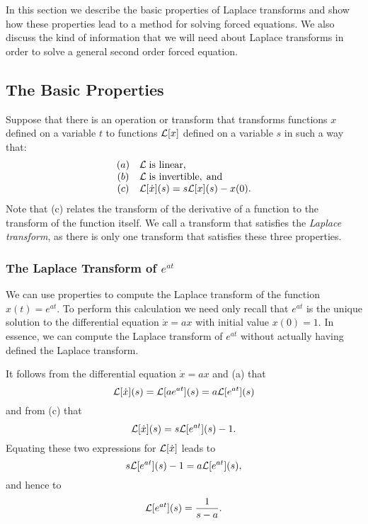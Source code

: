  \label{S:13.1}

In this section we describe the basic properties of Laplace transforms and 
show how these properties lead to a method for solving forced equations.   
We also discuss the kind of information that we will need about Laplace 
transforms in order to solve a general second order forced equation. 

\subsection*{The Basic Properties}

Suppose that there is an operation or transform that transforms functions $x$ 
defined on a variable $t$ to functions ${\cal L}[x]$ defined on a variable 
$s$ in such a way that:
\begin{equation}  \label{Tprops}
\begin{array}{cl}
(a) & {\cal L}\; \mbox{is linear},\\
(b) & {\cal L}\; \mbox{is invertible},\; \mbox{and}\\
(c) & {\cal L}[\dot{x}](s) = s{\cal L}[x](s) - x(0).
\end{array}
\end{equation}
Note that (c) relates the transform of the derivative of a 
function to the transform of the function itself.  We call a transform that 
satisfies  the {\em Laplace transform\/}, as there is only one 
transform that satisfies these three properties.

\subsubsection*{The Laplace Transform of $e^{at}$}

We can use properties  to compute the Laplace transform of the
function $x(t) = e^{at}$.  To perform this calculation we need only recall 
that $e^{at}$ is the unique solution to the differential equation 
$\dot{x}=ax$ with initial value $x(0)=1$.  In essence, we can compute the 
Laplace transform of $e^{at}$ without actually having defined the Laplace 
transform.

It follows from the differential equation $\dot{x}=ax$ and (a) 
that
\[
{\cal L}[\dot{x}](s) = {\cal L}[ae^{at}](s) = a{\cal L}[e^{at}](s)
\]
and from (c) that
\[
{\cal L}[\dot{x}](s) = s{\cal L}[e^{at}](s)-1.
\]
Equating these two expressions for ${\cal L}[\dot{x}]$ leads to
\[
s{\cal L}[e^{at}](s)-1 = a{\cal L}[e^{at}](s),
\]
and hence to 
\begin{equation} \label{eq:Lexp}
{\cal L}[e^{at}](s) = \frac{1}{s-a}.
\end{equation}

